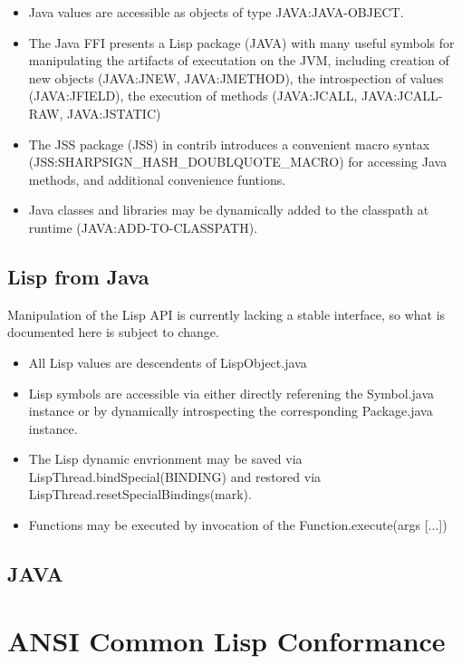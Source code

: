 \documentclass[10pt]{article}
\begin{document}
\begin{itemize}
\item Java values are accessible as objects of type JAVA:JAVA-OBJECT.
\item The Java FFI presents a Lisp package (JAVA) with many useful
  symbols for manipulating the artifacts of executation on the JVM,
  including creation of new objects (JAVA:JNEW, JAVA:JMETHOD), the
  introspection of values (JAVA:JFIELD), the execution of methods
  (JAVA:JCALL, JAVA:JCALL-RAW, JAVA:JSTATIC)
\item The JSS package (JSS) in contrib introduces a convenient macro
  syntax (JSS:SHARPSIGN_HASH_DOUBLQUOTE_MACRO) for accessing Java
  methods, and additional convenience funtions.
\item Java classes and libraries may be dynamically added to the
  classpath at runtime (JAVA:ADD-TO-CLASSPATH).
\end{itemize}

\subsection{Lisp from Java}

Manipulation of the Lisp API is currently lacking a stable interface,
so what is documented here is subject to change.  

\begin{itemize}
\item All Lisp values are descendents of LispObject.java
\item Lisp symbols are accessible via either directly referening the
  Symbol.java instance or by dynamically introspecting the
  corresponding Package.java instance.
\item The Lisp dynamic envrionment may be saved via
  LispThread.bindSpecial(BINDING) and restored via
  LispThread.resetSpecialBindings(mark).
\item Functions may be executed by invocation of the
  Function.execute(args [...]) 
\end{itemize}

\subsection{JAVA}


\section{ANSI Common Lisp Conformance}
\end{document}
